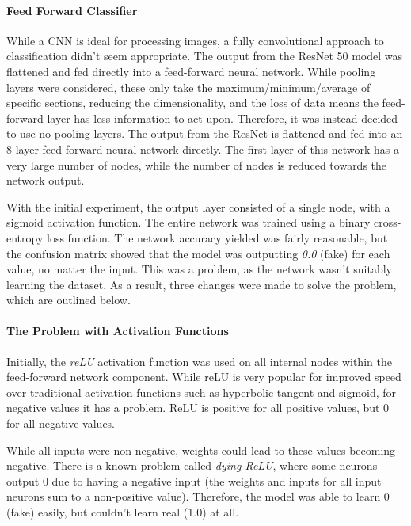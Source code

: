 \documentclass[12pt,a4paper]{article}
\begin{document}
                \paragraph{Feed Forward Classifier}
                While a CNN is ideal for processing images, a fully convolutional approach to classification didn't seem appropriate. The output from the ResNet 50 model was flattened and fed directly into a feed-forward neural network.
                While pooling layers were considered, these only take the maximum/minimum/average of specific sections, reducing the dimensionality, and the loss of data means the feed-forward layer has less information to act upon. Therefore,
                it was instead decided to use no pooling layers. The output from the ResNet is flattened and fed into an 8 layer feed forward neural network directly. The first layer of this network has a very large number of nodes,
                while the number of nodes is reduced towards the network output.
                
                With the initial experiment, the output layer consisted of a single node, with a sigmoid activation function. The entire network was trained using a binary cross-entropy loss function. The network accuracy yielded was fairly reasonable,
                but the confusion matrix showed that the model was outputting \emph{0.0} (fake) for each value, no matter the input. This was a problem, as the network wasn't suitably learning the dataset. As a result, three changes were made to solve the problem, which are outlined below.
                
                \paragraph{The Problem with Activation Functions}
                Initially, the \emph{reLU} activation function was used on all internal nodes within the feed-forward network component. While reLU is very popular for improved speed over traditional activation functions such as hyperbolic tangent and sigmoid,
                for negative values it has a problem. ReLU is positive for all positive values, but 0 for all negative values.

                While all inputs were non-negative, weights could lead to these values becoming negative. There is a known problem called \emph{dying ReLU}, where some neurons output 0
                due to having a negative input (the weights and inputs for all input neurons sum to a non-positive value). Therefore, the model was able to learn 0 (fake) easily, but couldn't learn real (1.0) at all. \cite{liu_liu_2017}
\end{document}
